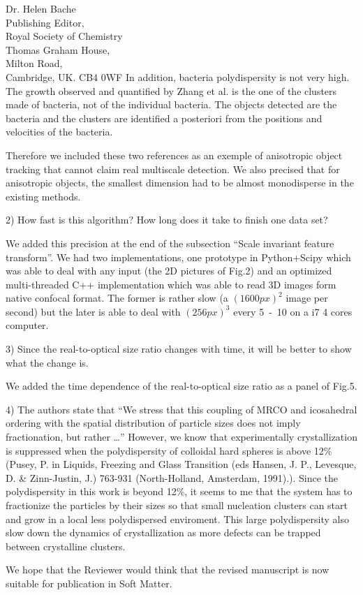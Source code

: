 \documentclass[a4paper, rebuttal, parskip=true, firsthead=false, fromemail=true, foldmarks=false]{scrlttr2}
\begin{document}
\begin{letter}{Dr. Helen Bache\\
Publishing Editor,\\
Royal Society of Chemistry\\
Thomas Graham House,\\
Milton Road,\\
Cambridge, UK. CB4 0WF}
In addition, bacteria polydispersity is not very high. The growth observed and quantified by Zhang et al. is the one of the clusters made of bacteria, not of the individual bacteria. The objects detected are the bacteria and the clusters are identified a posteriori from the positions and velocities of the bacteria.

Therefore we included these two references as an exemple of anisotropic object tracking that cannot claim real multiscale detection. We also precised that for anisotropic objects, the smallest dimension had to be almost monodisperse in the existing methods.

\begin{quotationi}
2)      How fast is this algorithm? How long does it take to finish one data set?
\end{quotationi}

We added this precision at the end of the subsection ``Scale invariant feature transform''. We had two implementations, one prototype in Python+Scipy which was able to deal with any input (the 2D pictures of Fig.2) and an optimized multi-threaded C++ implementation which was able to read 3D images form native confocal format. The former is rather slow (a $(\unit{1600}{px})^2$ image per second) but the later is able to deal with $(\unit{256}{px})^3$ every \unit{5-10}{\second} on a i7 4 cores computer.

\begin{quotationi}
3)      Since the real-to-optical size ratio changes with time, it will be better to show what the change is.
\end{quotationi}

We added the time dependence of the real-to-optical size ratio as a panel of Fig.5.

\begin{quotationi}4) The authors state that ``We stress that this coupling of MRCO and icosahedral ordering with the spatial distribution of particle sizes does not imply fractionation, but rather \ldots'' However, we know that experimentally crystallization is suppressed when the polydispersity of colloidal hard spheres is above 12\% (Pusey, P. in Liquids, Freezing and Glass Transition (eds Hansen, J. P., Levesque, D. \& Zinn-Justin, J.) 763-931 (North-Holland, Amsterdam, 1991).). Since the polydispersity in this work is beyond 12\%, it seems to me that the system has to fractionize the particles by their sizes so that small nucleation clusters can start and grow in a local less polydispersed enviroment. This large polydispersity also slow down the dynamics of crystallization as more defects can be trapped between crystalline clusters.
\end{quotationi}

We hope that the Reviewer would think that the revised manuscript is now suitable for publication in Soft Matter. 


\end{letter} 
\end{document}
